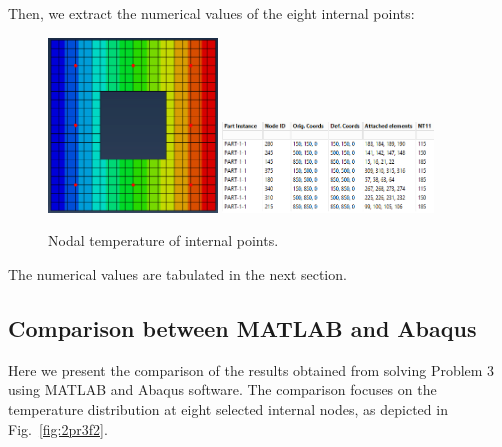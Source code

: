 Then, we extract the numerical values of the eight internal points:
\begin{figure}[H]
    \centering
    \includegraphics[width=0.4\textwidth]{Images/ab3/ab10.png} \qquad 
    \includegraphics[width=0.5\textwidth]{Images/ab3/ab11.png}
    \caption{Nodal temperature of internal points.}
    \label{fig:abb1011}
\end{figure}

The numerical values are tabulated in the next section.

\newpage

\subsection{Comparison between MATLAB and Abaqus}
\label{sub:comparison4}%

Here we present the comparison of the results obtained from solving Problem 3 using MATLAB and Abaqus software. The comparison focuses on the temperature distribution at eight selected internal nodes, as depicted in Fig.~\ref{fig:2pr3f2}.

